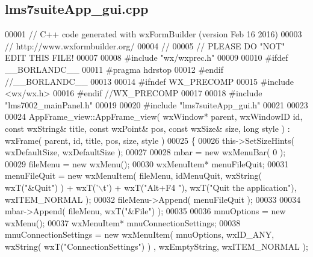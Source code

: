 \subsection{lms7suite\+App\+\_\+gui.\+cpp}
\label{lms7suiteApp__gui_8cpp_source}

\begin{DoxyCode}
00001 \textcolor{comment}{// C++ code generated with wxFormBuilder (version Feb 16 2016)}
00003 \textcolor{comment}{// http://www.wxformbuilder.org/}
00004 \textcolor{comment}{//}
00005 \textcolor{comment}{// PLEASE DO "NOT" EDIT THIS FILE!}
00007 \textcolor{comment}{}
00008 \textcolor{preprocessor}{#include "wx/wxprec.h"}
00009 
00010 \textcolor{preprocessor}{#ifdef \_\_BORLANDC\_\_}
00011 \textcolor{preprocessor}{#pragma hdrstop}
00012 \textcolor{preprocessor}{#endif //\_\_BORLANDC\_\_}
00013 
00014 \textcolor{preprocessor}{#ifndef WX\_PRECOMP}
00015 \textcolor{preprocessor}{#include <wx/wx.h>}
00016 \textcolor{preprocessor}{#endif //WX\_PRECOMP}
00017 
00018 \textcolor{preprocessor}{#include "lms7002_mainPanel.h"}
00019 
00020 \textcolor{preprocessor}{#include "lms7suiteApp_gui.h"}
00021 
00023 
00024 AppFrame_view::AppFrame_view( wxWindow* parent, wxWindowID \textcolor{keywordtype}{id}, \textcolor{keyword}{const} wxString& title, \textcolor{keyword}{const} wxPoint& pos, \textcolor{keyword}{
      const} wxSize& size, \textcolor{keywordtype}{long} style ) : wxFrame( parent, id, title, pos, size, style )
00025 \{
00026     this->SetSizeHints( wxDefaultSize, wxDefaultSize );
00027     
00028     mbar = \textcolor{keyword}{new} wxMenuBar( 0 );
00029     fileMenu = \textcolor{keyword}{new} wxMenu();
00030     wxMenuItem* menuFileQuit;
00031     menuFileQuit = \textcolor{keyword}{new} wxMenuItem( fileMenu, idMenuQuit, wxString( wxT(\textcolor{stringliteral}{"&Quit"}) ) + wxT(\textcolor{charliteral}{'\(\backslash\)t'}) + wxT(\textcolor{stringliteral}{"Alt+F4
      "}), wxT(\textcolor{stringliteral}{"Quit the application"}), wxITEM\_NORMAL );
00032     fileMenu->Append( menuFileQuit );
00033     
00034     mbar->Append( fileMenu, wxT(\textcolor{stringliteral}{"&File"}) ); 
00035     
00036     mnuOptions = \textcolor{keyword}{new} wxMenu();
00037     wxMenuItem* mnuConnectionSettings;
00038     mnuConnectionSettings = \textcolor{keyword}{new} wxMenuItem( mnuOptions, wxID\_ANY, wxString( wxT(\textcolor{stringliteral}{"ConnectionSettings"}) ) , 
      wxEmptyString, wxITEM\_NORMAL );

\end{DoxyCode}
